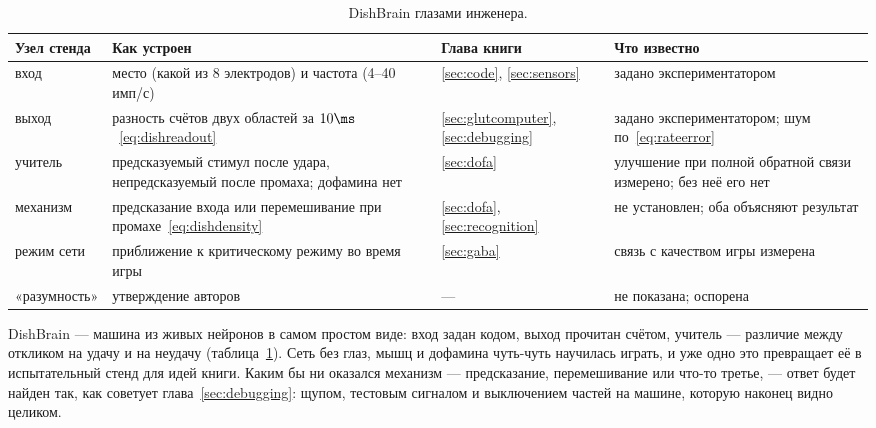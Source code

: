 \begin{table}[t]
\centering
\footnotesize
\setlength{\tabcolsep}{4pt}
\renewcommand{\arraystretch}{1.15}
\begin{tabular}{>{\raggedright}p{2.1cm}>{\raggedright}p{4.2cm}>{\raggedright}p{1.9cm}>{\raggedright\arraybackslash}p{4.6cm}}
\toprule
Узел стенда & Как устроен & Глава книги & Что известно \\
\midrule
вход & место (какой из 8 электродов) и частота (4--40 имп/с) & \ref{sec:code}, \ref{sec:sensors} & задано экспериментатором \\
выход & разность счётов двух областей за $10\ms$~\eqref{eq:dishreadout} & \ref{sec:glutcomputer}, \ref{sec:debugging} & задано экспериментатором; шум по~\eqref{eq:rateerror} \\
учитель & предсказуемый стимул после удара, непредсказуемый после промаха; дофамина нет & \ref{sec:dofa} & улучшение при полной обратной связи измерено; без неё его нет \\
механизм & предсказание входа или перемешивание при промахе~\eqref{eq:dishdensity} & \ref{sec:dofa}, \ref{sec:recognition} & не установлен; оба объясняют результат \\
режим сети & приближение к критическому режиму во время игры & \ref{sec:gaba} & связь с качеством игры измерена \\
«разумность» & утверждение авторов & --- & не показана; оспорена \\
\bottomrule
\end{tabular}
\caption{DishBrain глазами инженера.}
\label{tab:dishbrain}
\end{table}

DishBrain --- машина из живых нейронов в самом простом виде: вход задан кодом, выход прочитан счётом, учитель --- различие между откликом на удачу и на неудачу (таблица~\ref{tab:dishbrain}). Сеть без глаз, мышц и дофамина чуть-чуть научилась играть, и уже одно это превращает её в испытательный стенд для идей книги. Каким бы ни оказался механизм --- предсказание, перемешивание или что-то третье, --- ответ будет найден так, как советует глава~\ref{sec:debugging}: щупом, тестовым сигналом и выключением частей на машине, которую наконец видно целиком.
